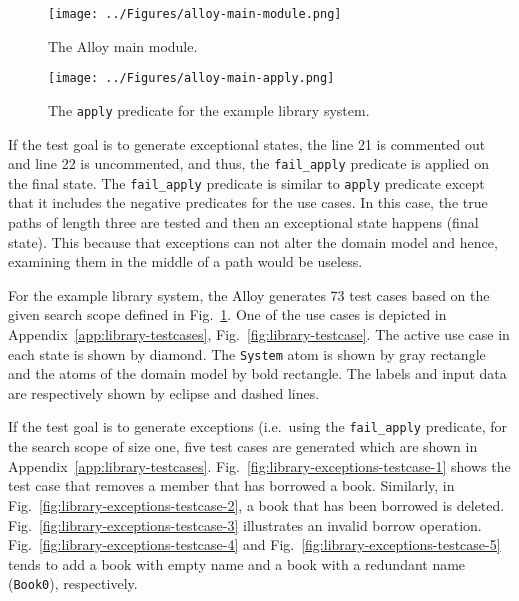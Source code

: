 \begin{figure}[h]
\centering
\texttt{[image: ../Figures/alloy-main-module.png]}
\caption{The Alloy main module.}
\label{fig:alloy-main-module}
\end{figure}

\begin{figure}[h]
\centering
\texttt{[image: ../Figures/alloy-main-apply.png]}
\caption{The \texttt{apply} predicate for the example library system.}
\label{fig:lalloy-main-apply}
\end{figure}

If the test goal is to generate exceptional states, the line 21 is commented out and line 22 is uncommented, and thus, the \texttt{fail\_apply} predicate is applied on the final state. The \texttt{fail\_apply} predicate is similar to \texttt{apply} predicate except that it includes the negative predicates for the use cases. In this case, the true paths of length three are tested and then an exceptional state happens (final state). This because that exceptions can not alter the domain model and hence, examining them in the middle of a path would be useless.

For the example library system, the Alloy generates 73 test cases based on the given search scope defined in Fig.~\ref{fig:alloy-main-module}. One of the use cases is depicted in Appendix~\ref{app:library-testcases}, Fig.~\ref{fig:library-testcase}. The active use case in each state is shown by diamond. The \texttt{System} atom is shown by gray rectangle and the atoms of the domain model by bold rectangle. The labels and input data are respectively shown by eclipse and dashed lines.

If the test goal is to generate exceptions (i.e.\ using the \texttt{fail\_apply} predicate, for the search scope of size one, five test cases are generated which are shown in Appendix~\ref{app:library-testcases}. Fig.~\ref{fig:library-exceptions-testcase-1} shows the test case that removes a member that has borrowed a book. Similarly, in Fig.~\ref{fig:library-exceptions-testcase-2}, a book that has been borrowed is deleted. Fig.~\ref{fig:library-exceptions-testcase-3} illustrates an invalid borrow operation. Fig.~\ref{fig:library-exceptions-testcase-4} and Fig.~\ref{fig:library-exceptions-testcase-5} tends to add a book with empty name and a book with a redundant name (\texttt{Book0}), respectively.